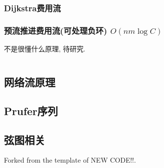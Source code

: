 \documentclass[a4paper, twoside]{article}
\begin{document}
\begin{multicols}{2}
				\subsubsection{Dijkstra费用流}
					
				
				\subsubsection{预流推进费用流(可处理负环) $O(nm \log C)$}
					不是很懂什么原理, 待研究.

					\inputminted{cpp}{../src/graph/预流推进费用流.cpp}



			

			\subsection{网络流原理}
				
			
			\subsection{Prufer序列}
				

			\subsection{弦图相关}
				Forked from the template of NEW CODE!!.
				



			


\end{multicols}
\end{document}
